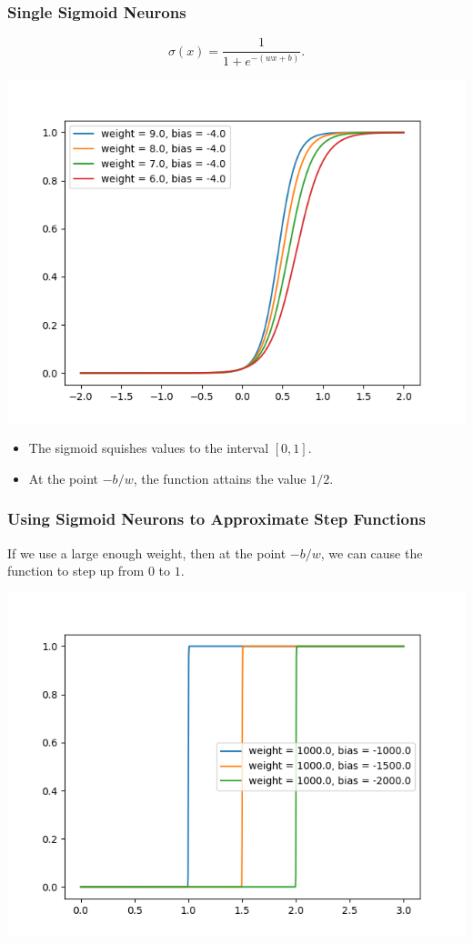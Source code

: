 \documentclass[11pt]{beamer}
\begin{document}
\begin{frame}[t]
\frametitle{Single Sigmoid Neurons}
{\small
\[
    \sigma (x) = \frac{1}{1 + e^{-(w x + b)}}.
\]
\begin{center}
\includegraphics[scale=0.4]{sigmoidOutput.png}
\end{center}
\begin{itemize}
    \item The sigmoid squishes values to the interval $[0, 1]$.
    \item At the point $- b / w$, the function attains the value $1/2$.
\end{itemize}
}
\end{frame}

\begin{frame}[t]
\frametitle{Using Sigmoid Neurons to Approximate Step Functions}
{\small
If we use a large enough weight, then at the point $- b / w$, we can
cause the function to step up from $0$ to $1$.
\begin{center}
\includegraphics[scale=0.4]{stepfunction.png}
\end{center}
}
\end{frame}
\end{document}
